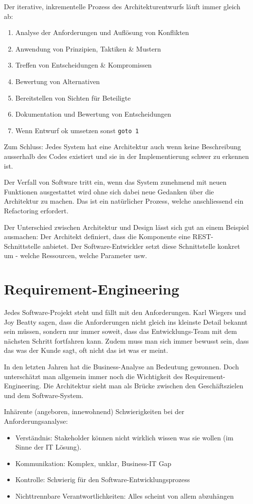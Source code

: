 Der iterative, inkrementelle Prozess des Architekturentwurfs läuft immer gleich ab:
\begin{enumerate}
	\item Analyse der Anforderungen und Auflösung von Konflikten
	\item Anwendung von Prinzipien, Taktiken \& Mustern
	\item Treffen von Entscheidungen \& Kompromissen
	\item Bewertung von Alternativen
	\item Bereitstellen von Sichten für Beteiligte
	\item Dokumentation und Bewertung von Entscheidungen
	\item Wenn Entwurf ok umsetzen sonst \verb|goto 1|
\end{enumerate}
Zum Schluss: Jedes System hat eine Architektur auch wenn keine Beschreibung ausserhalb des Codes existiert und sie in der Implementierung schwer zu erkennen ist.

Der Verfall von Software tritt ein, wenn das System zunehmend mit neuen Funktionen ausgestattet wird ohne sich dabei neue Gedanken über die Architektur zu machen. Das ist ein natürlicher Prozess, welche anschliessend ein Refactoring erfordert.

Der Unterschied zwischen Architektur und Design lässt sich gut an einem Beispiel ausmachen: Der Architekt definiert, dass die Komponente eine REST-Schnittstelle anbietet. Der Software-Entwickler setzt diese Schnittstelle konkret um - welche Ressourcen, welche Parameter usw.

\section{Requirement-Engineering}
Jedes Software-Projekt steht und fällt mit den Anforderungen. Karl Wiegers und Joy Beatty sagen, dass die Anforderungen nicht gleich ins kleinste Detail bekannt sein müssen, sondern nur immer soweit, dass das Entwicklungs-Team mit dem nächsten Schritt fortfahren kann. Zudem muss man sich immer bewusst sein, dass das was der Kunde sagt, oft nicht das ist was er meint.

In den letzten Jahren hat die Business-Analyse an Bedeutung gewonnen. Doch unterschätzt man allgemein immer noch die Wichtigkeit des Requirement-Engineering. Die Architektur sieht man als Brücke zwischen den Geschäftszielen und dem Software-System.

Inhärente (angeboren, innewohnend) Schwierigkeiten bei der Anforderungsanalyse:
\begin{itemize}
	\item Verständnis: Stakeholder können nicht wirklich wissen was sie wollen (im Sinne der IT Lösung).
	\item Kommunikation: Komplex, unklar, Business-IT Gap
	\item Kontrolle: Schwierig für den Software-Entwicklungsprozess
	\item Nichttrennbare Verantwortlichkeiten: Alles scheint von allem abzuhängen
\end{itemize}

